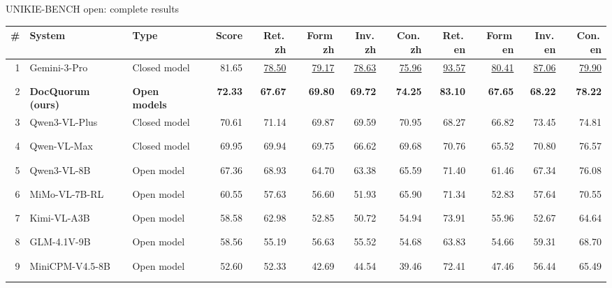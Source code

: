 \documentclass[aspectratio=169,10pt]{beamer}
\begin{document}
\begin{frame}{UNIKIE-BENCH open: complete results}
\begingroup\tiny\renewcommand{\arraystretch}{1.02}\setlength{\tabcolsep}{2.6pt}
\begin{tabularx}{\textwidth}{@{}rYl@{\hspace{6pt}}lrrrrrrrrr@{}}\toprule
\textbf{\#} & \textbf{System} & \textbf{Type} &  & \textbf{Score} & \textbf{Ret.\,zh} & \textbf{Form\,zh} & \textbf{Inv.\,zh} & \textbf{Con.\,zh} & \textbf{Ret.\,en} & \textbf{Form\,en} & \textbf{Inv.\,en} & \textbf{Con.\,en}\\ & Gemini-3-Pro & {\color{muted}Closed model} & \textcolor{muted!45}{\rule{0.98cm}{1.05ex}} & 81.65 & \underline{78.50} & \underline{79.17} & \underline{78.63} & \underline{75.96} & \underline{93.57} & \underline{80.41} & \underline{87.06} & \underline{79.90}\\
2 & \textbf{DocQuorum (ours)} & {\color{good}\textbf{Open models}} & \textcolor{good}{\rule{0.87cm}{1.05ex}} & \textbf{72.33} & \textbf{67.67} & \textbf{69.80} & \textbf{69.72} & \textbf{74.25} & \textbf{83.10} & \textbf{67.65} & \textbf{68.22} & \textbf{78.22}\\
3 & Qwen3-VL-Plus & {\color{muted}Closed model} & \textcolor{muted!45}{\rule{0.85cm}{1.05ex}} & 70.61 & 71.14 & 69.87 & 69.59 & 70.95 & 68.27 & 66.82 & 73.45 & 74.81\\
4 & Qwen-VL-Max & {\color{muted}Closed model} & \textcolor{muted!45}{\rule{0.84cm}{1.05ex}} & 69.95 & 69.94 & 69.75 & 66.62 & 69.68 & 70.76 & 65.52 & 70.80 & 76.57\\
5 & Qwen3-VL-8B & {\color{good}Open model} & \textcolor{good!45}{\rule{0.81cm}{1.05ex}} & 67.36 & 68.93 & 64.70 & 63.38 & 65.59 & 71.40 & 61.46 & 67.34 & 76.08\\
6 & MiMo-VL-7B-RL & {\color{good}Open model} & \textcolor{good!45}{\rule{0.73cm}{1.05ex}} & 60.55 & 57.63 & 56.60 & 51.93 & 65.90 & 71.34 & 52.83 & 57.64 & 70.55\\
7 & Kimi-VL-A3B & {\color{good}Open model} & \textcolor{good!45}{\rule{0.70cm}{1.05ex}} & 58.58 & 62.98 & 52.85 & 50.72 & 54.94 & 73.91 & 55.96 & 52.67 & 64.64\\
8 & GLM-4.1V-9B & {\color{good}Open model} & \textcolor{good!45}{\rule{0.70cm}{1.05ex}} & 58.56 & 55.19 & 56.63 & 55.52 & 54.68 & 63.83 & 54.66 & 59.31 & 68.70\\
9 & MiniCPM-V4.5-8B & {\color{good}Open model} & \textcolor{good!45}{\rule{0.63cm}{1.05ex}} & 52.60 & 52.33 & 42.69 & 44.54 & 39.46 & 72.41 & 47.46 & 56.44 & 65.49\\

\end{tabularx}
\end{frame}
\end{document}
